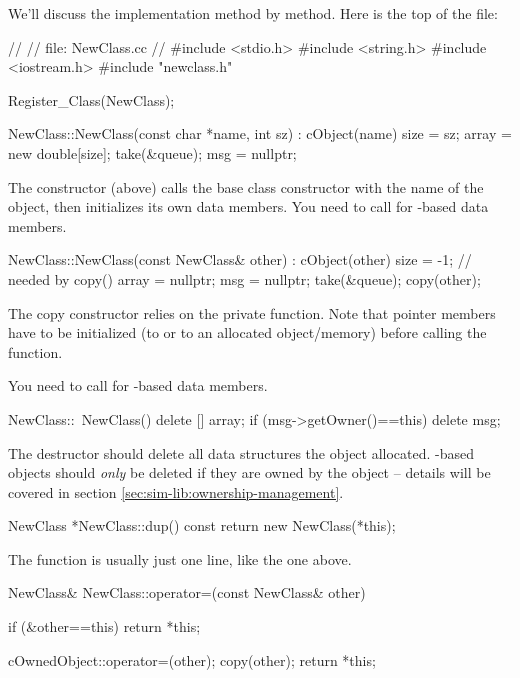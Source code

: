 We'll discuss the implementation method by method.
Here is the top of the  file:

\begin{cpp}
//
// file: NewClass.cc
//
#include <stdio.h>
#include <string.h>
#include <iostream.h>
#include "newclass.h"

Register_Class(NewClass);

NewClass::NewClass(const char *name, int sz) : cObject(name)
{
    size = sz;
    array = new double[size];
    take(&queue);
    msg = nullptr;
}
\end{cpp}

The constructor (above) calls the base class constructor with
the name of the object, then initializes its own data members.
You need to call  for -based data members.

\begin{cpp}
NewClass::NewClass(const NewClass& other) : cObject(other)
{
    size = -1; // needed by copy()
    array = nullptr;
    msg = nullptr;
    take(&queue);
    copy(other);
}
\end{cpp}

The copy constructor relies on the private  function.
Note that pointer members have to be initialized (to  or to an
allocated object/memory) before calling the  function.

You need to call  for -based data members.

\begin{cpp}
NewClass::~NewClass()
{
    delete [] array;
    if (msg->getOwner()==this)
        delete msg;
}
\end{cpp}

The destructor should delete all data structures the object allocated.
-based objects should \textit{only} be deleted if they
are owned by the object -- details will be covered in section
\ref{sec:sim-lib:ownership-management}.

\begin{cpp}
NewClass *NewClass::dup() const
{
    return new NewClass(*this);
}
\end{cpp}

The  function  is usually just one line, like the one above.

\begin{cpp}
NewClass& NewClass::operator=(const NewClass& other)
{
    if (&other==this)
        return *this;

    cOwnedObject::operator=(other);
    copy(other);
    return *this;
}
\end{cpp}

